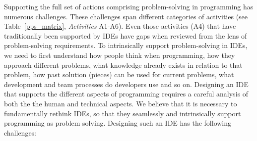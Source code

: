 Supporting the full set of actions comprising problem-solving in programming has numerous challenges.
These challenges span different categories of activities (see Table~\ref{pps_matrix}, \textit{Activities} A1-A6). Even those activities (A4) that have traditionally been supported by IDEs have gaps when reviewed from the lens of problem-solving requirements.
To intrinsically support problem-solving in IDEs, we need to first understand how people think when programming, how they approach different problems, what knowledge already exists in relation to that problem, how past solution (pieces) can be used for current problems, what development and team processes do developers use and so on. Designing an IDE that supports the different aspects of programming requires a careful analysis of both the the human and technical aspects. 
We believe that it is necessary to fundamentally rethink IDEs, so that they seamlessly and intrinsically support programming as problem solving. Designing such an IDE has the following challenges:

